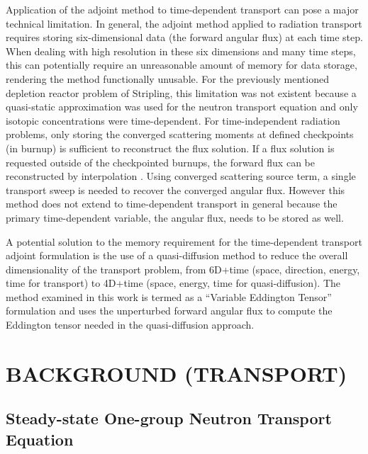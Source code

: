 \documentclass[12pt]{report}
\begin{document}
Application of the adjoint method to time-dependent transport can pose a major technical limitation. In general, the adjoint method applied to radiation transport requires storing six-dimensional data (the forward angular flux) at each time step. When dealing with high resolution in these six dimensions and many time steps, this can potentially require an unreasonable amount of memory for data storage, rendering the method functionally unusable. For the previously mentioned depletion reactor problem of Stripling, this limitation was not existent because a quasi-static approximation was used for the neutron transport equation and only isotopic concentrations were time-dependent. For time-independent radiation problems, only storing the converged scattering moments at defined checkpoints (in burnup) is sufficient to reconstruct the flux solution. If a flux solution is requested outside of the checkpointed burnups, the forward flux can be reconstructed by interpolation \cite{Stripling}.
Using converged scattering source term, a single transport sweep is needed to recover the converged
angular flux. However this method does not extend to time-dependent transport in general because
the primary time-dependent variable, the angular flux, needs to be stored as well. 

A potential solution to the memory requirement for the time-dependent transport adjoint formulation is the use of a quasi-diffusion method to reduce the overall dimensionality of the transport problem, from 6D+time (space, direction, energy, time for transport) to 4D+time (space, energy, time for quasi-diffusion). The method examined in this work is termed  as a ``Variable Eddington Tensor'' formulation and uses the unperturbed forward angular flux to compute the Eddington tensor needed in the quasi-diffusion approach.

\chapter{\uppercase {Background (Transport)}}
\section{Steady-state One-group Neutron Transport Equation}
\end{document}
